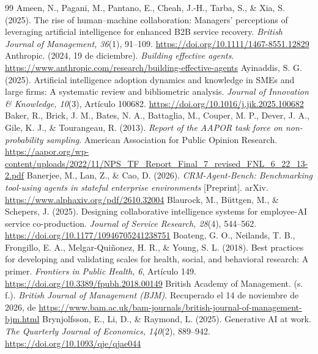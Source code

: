 \documentclass[12pt,letterpaper]{article}
\begin{document}
\clearpage
\begingroup{}\begin{thebibliography}{99}
 Ameen, N., Pagani, M., Pantano, E., Cheah, J.-H., Tarba, S., \& Xia, S. (2025). The rise of human--machine collaboration: Managers’ perceptions of leveraging artificial intelligence for enhanced B2B service recovery. \emph{British Journal of Management, 36}(1), 91--109. \url{https://doi.org/10.1111/1467-8551.12829}
 Anthropic. (2024, 19 de diciembre). \emph{Building effective agents}. \url{https://www.anthropic.com/research/building-effective-agents}
 Ayinaddis, S. G. (2025). Artificial intelligence adoption dynamics and knowledge in SMEs and large firms: A systematic review and bibliometric analysis. \emph{Journal of Innovation \& Knowledge, 10}(3), Artículo 100682. \url{https://doi.org/10.1016/j.jik.2025.100682}
 Baker, R., Brick, J. M., Bates, N. A., Battaglia, M., Couper, M. P., Dever, J. A., Gile, K. J., \& Tourangeau, R. (2013). \emph{Report of the AAPOR task force on non-probability sampling}. American Association for Public Opinion Research. \url{https://aapor.org/wp-content/uploads/2022/11/NPS_TF_Report_Final_7_revised_FNL_6_22_13-2.pdf}
 Banerjee, M., Lan, Z., \& Cao, D. (2026). \emph{CRM-Agent-Bench: Benchmarking tool-using agents in stateful enterprise environments} [Preprint]. arXiv. \url{https://www.alphaxiv.org/pdf/2610.32004}
 Blaurock, M., Büttgen, M., \& Schepers, J. (2025). Designing collaborative intelligence systems for employee-AI service co-production. \emph{Journal of Service Research, 28}(4), 544--562. \url{https://doi.org/10.1177/10946705241238751}
 Boateng, G. O., Neilands, T. B., Frongillo, E. A., Melgar-Quiñonez, H. R., \& Young, S. L. (2018). Best practices for developing and validating scales for health, social, and behavioral research: A primer. \emph{Frontiers in Public Health, 6}, Artículo 149. \url{https://doi.org/10.3389/fpubh.2018.00149}
 British Academy of Management. (s. f.). \emph{British Journal of Management (BJM)}. Recuperado el 14 de noviembre de 2026, de \url{https://www.bam.ac.uk/bam-journals/british-journal-of-management-bjm.html}
 Brynjolfsson, E., Li, D., \& Raymond, L. (2025). Generative AI at work. \emph{The Quarterly Journal of Economics, 140}(2), 889--942. \url{https://doi.org/10.1093/qje/qjae044}

\end{thebibliography}
\end{document}

